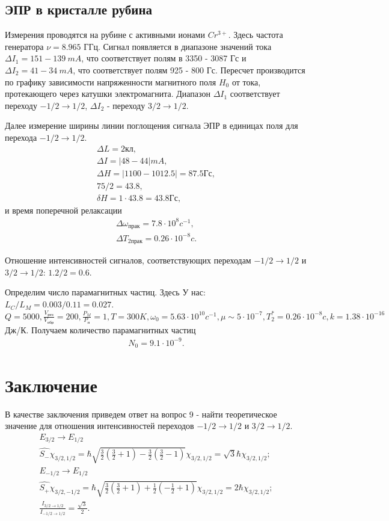 \subsection{ЭПР в кристалле рубина}
Измерения проводятся на рубине с активными ионами $Cr^{3+}$. Здесь частота генератора $\nu=8.965$ ГГц. Сигнал появляется в диапазоне значений тока $\Delta I_1=151 - 139 ~mA$, что соответствует полям в 3350 - 3087 Гс и  $\Delta I_2=41 - 34~ mA$, что соответствует полям 925 - 800 Гс. Пересчет производится по графику зависимости напряженности магнитного поля $H_0$ от тока, протекающего через катушки электромагнита. Диапазон $\Delta I_1$ соответствует переходу $-1/2 \rightarrow 1/2$, $\Delta I_2$ - переходу $3/2 \rightarrow 1/2$.

Далее измерение ширины линии поглощения сигнала ЭПР в единицах поля для перехода $-1/2 \rightarrow 1/2$. 
\begin{gather*}
 	\Delta L=2 \text{кл}, \\
 	\Delta I= |48-44| mA, \\
 	\Delta H= |1100-1012.5|=87.5 \text{Гс}, \\
 	75 / 2 = 43.8, \\
 	\delta H = 1 \cdot 43.8 = 43.8 \text{Гс},
\end{gather*}
и время поперечной релаксации
\begin{gather*} 	
	\Delta \omega_{\text{прак}}=7.8 \cdot 10^{8} c^{-1}, \\
 	\Delta T_{\text{2прак}} = 0.26 \cdot 10^{-8} c.
\end{gather*}

Отношение интенсивностей сигналов, соответствующих переходам $-1/2 \rightarrow 1/2$ и $3/2 \rightarrow 1/2$: $1.2/2=0.6$.

Определим число парамагнитных частиц. Здесь У нас: $L_C/L_M=0.003/0.11=0.027$. $Q=5000, \frac{V_\text{рез}}{V_\text{обр}}=200, \frac{P_M}{P_{\text{п}}}=1, T=300 K, \omega_0=5.63 \cdot 10^{10} c^{-1}, \mu \sim 5 \cdot 10^{-7}, T_2^* = 0.26 \cdot 10^{-8} c, k=1.38 \cdot 10^{-16}$ Дж/К. Получаем количество парамагнитных частиц
\begin{gather*}
 	N_0=9.1 \cdot 10^{-9}.
\end{gather*}

\section{Заключение}
В качестве заключения приведем ответ на вопрос 9 - найти теоретическое значение для отношения интенсивностей переходов $-1/2 \rightarrow 1/2$ и $3/2 \rightarrow 1/2$.
\begin{gather*} 	
	E_{3/2} \rightarrow E_{1/2} \\
	\widehat{S_-}\chi_{3/2,1/2} = \hbar \sqrt{\frac32(\frac32+1)-\frac32(\frac32-1)}\chi_{3/2,1/2} = \sqrt{3} \hbar \chi_{3/2,1/2}; \\
	E_{-1/2} \rightarrow E_{1/2} \\
	\widehat{S_+}\chi_{3/2,-1/2} = \hbar \sqrt{\frac32(\frac32+1)+\frac12(-\frac12+1)}\chi_{3/2,1/2} = 2 \hbar \chi_{3/2,1/2}; \\
	\frac{I_{3/2 \rightarrow 1/2}}{I_{-1/2 \rightarrow 1/2}} = \frac{\sqrt{3}}{2}.
\end{gather*}

